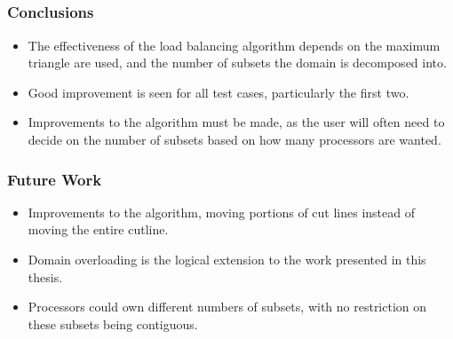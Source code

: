 \documentclass[]{beamer}
\begin{document}
\subsection{}
\begin{frame}[t]\frametitle{Conclusions}
\begin{block}{}
\begin{itemize}
\item The effectiveness of the load balancing algorithm depends on the maximum triangle are used, and the number of subsets the domain is decomposed into.
\item Good improvement is seen for all test cases, particularly the first two. 
\item Improvements to the algorithm must be made, as the user will often need to decide on the number of subsets based on how many processors are wanted. 
\end{itemize}
\end{block}
\end{frame}

\begin{frame}[t]\frametitle{Future Work}
\begin{block}{}
\begin{itemize}
\item Improvements to the algorithm, moving portions of cut lines instead of moving the entire cutline.
\item Domain overloading is the logical extension to the work presented in this thesis.
\item Processors could own different numbers of subsets, with no restriction on these subsets being contiguous.
\end{itemize}
\end{block}
\end{frame}



%
%



%	
%	
%	
%	
%
\end{document}
